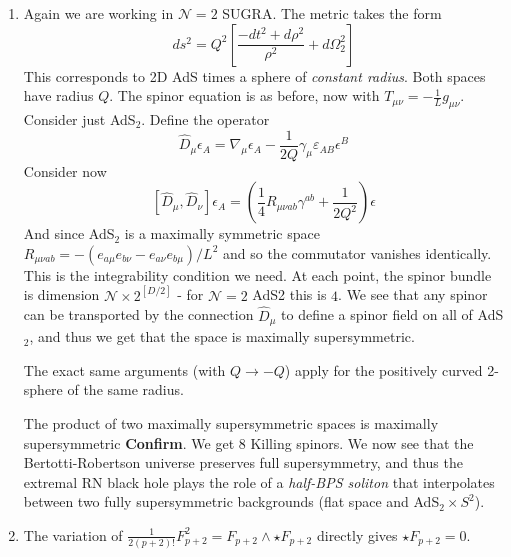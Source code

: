 \documentclass[11pt, class=article, crop=false]{standalone}
\begin{document}
\begin{enumerate}
	\item Again we are working in $\mathcal N = 2$ SUGRA. The metric takes the form
	\[
		ds^2 = Q^2 \left[ \frac{-dt^2 + d\rho^2}{\rho^2} + d \Omega_2^2 \right]
	\]
	This corresponds to 2D AdS times a sphere of \emph{constant radius}. Both spaces have radius $Q$. The spinor equation is as before, now with $T_{\mu \nu} = -\frac{1}{L} g_{\mu \nu}$. Consider just AdS$_{2}$. Define the operator 
	\[
		\hat D_{\mu} \epsilon_A = \nabla_\mu \epsilon_A - \frac{1}{2 Q} \gamma_{\mu} \varepsilon_{AB} \epsilon^B
	\]
	Consider now
	\[
		[\hat D_{\mu}, \hat D_\nu] \epsilon_A = (\frac14 R_{\mu \nu a b} \gamma^{a b} + \frac1{2Q^2}) \epsilon
	\]
	And since AdS$_{2}$ is a maximally symmetric space $R_{\mu \nu a b} = - (e_{a\mu} e_{b\nu} - e_{a \nu} e_{b \mu})/L^2$ and so the commutator vanishes identically. This is the integrability condition we need. At each point, the spinor bundle is dimension $\mathcal N \times 2^{[D/2]}$ - for $\mathcal N=2$ AdS2 this is $4$. We see that any spinor can be transported by the connection $\hat D_{\mu}$ to define a spinor field on all of AdS$_{2}$, and thus we get that the space is maximally supersymmetric.
	
	The exact same arguments (with $Q \to -Q$) apply for the positively curved 2-sphere of the same radius. 
	
	The product of two maximally supersymmetric spaces is maximally supersymmetric \textbf{Confirm}. We get $8$ Killing spinors. 
	We now see that the Bertotti-Robertson universe preserves full supersymmetry, and thus the extremal RN black hole plays the role of a \emph{half-BPS soliton} that interpolates between two fully supersymmetric backgrounds (flat space and AdS$_{2} \times S^2$). 
	
	
	
	
	\item The variation of $\frac{1}{2(p+2)!} F_{p+2}^2 = F_{p+2} \wedge \star F_{p+2}$ directly gives $\star F_{p+2} = 0$. 
	

\end{enumerate}
\end{document}
